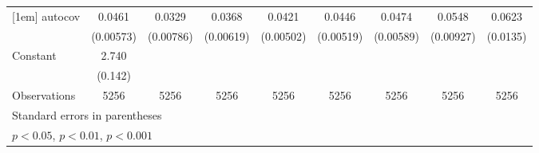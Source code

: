 \begin{table}[htbp]
\begin{tabular}{l*{8}{c}}
[1em]
autocov         &   0.0461\sym{***}&   0.0329\sym{***}&   0.0368\sym{***}&   0.0421\sym{***}&   0.0446\sym{***}&   0.0474\sym{***}&   0.0548\sym{***}&   0.0623\sym{***}\\
                &(0.00573)         &(0.00786)         &(0.00619)         &(0.00502)         &(0.00519)         &(0.00589)         &(0.00927)         & (0.0135)         \\
[1em]
Constant        &    2.740\sym{***}&                  &                  &                  &                  &                  &                  &                  \\
                &  (0.142)         &                  &                  &                  &                  &                  &                  &                  \\
\hline
Observations    &     5256         &     5256         &     5256         &     5256         &     5256         &     5256         &     5256         &     5256         \\
\hline\hline
\multicolumn{9}{l}{\footnotesize Standard errors in parentheses}\\
\multicolumn{9}{l}{\footnotesize \sym{*} \(p<0.05\), \sym{**} \(p<0.01\), \sym{***} \(p<0.001\)}\\
\end{tabular}
\end{table}
